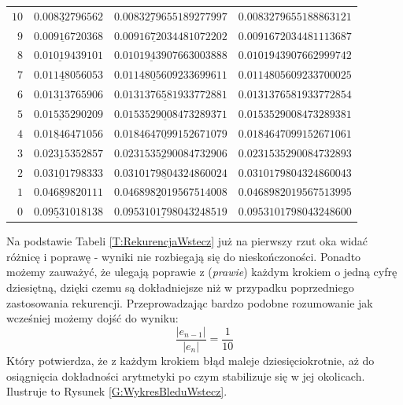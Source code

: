 \documentclass[11pt,leqno]{article}
\begin{document}
\begin{table}[!h]
\begin{center}
\begin{tabular}{r|l|l|l}
        $10$          & $\underline{0.008327965}62$ & $\underline{0.008327965518}9277997$ & $0.0083279655188863121$ \\
        $9$           & $\underline{0.009167203}68$ & $\underline{0.0091672034481}072202$ & $0.0091672034481113687$ \\
        $8$           & $\underline{0.01019439}101$ & $\underline{0.010194390766}3003888$ & $0.0101943907662999742$ \\
        $7$           & $\underline{0.011480560}53$ & $\underline{0.0114805609233}699611$ & $0.0114805609233700025$ \\
        $6$           & $\underline{0.01313765}906$ & $\underline{0.01313765819337728}81$ & $0.0131376581933772854$ \\
        $5$           & $\underline{0.01535290}209$ & $\underline{0.01535290084732893}71$ & $0.0153529008473289381$ \\
        $4$           & $\underline{0.0184647}1056$ & $\underline{0.01846470991526710}79$ & $0.0184647099152671061$ \\
        $3$           & $\underline{0.02315352}857$ & $\underline{0.0231535290084732}906$ & $0.0231535290084732893$ \\
        $2$           & $\underline{0.03101798}333$ & $\underline{0.03101798043248600}24$ & $0.0310179804324860043$ \\
        $1$           & $\underline{0.046898201}11$ & $\underline{0.046898201956751}4008$ & $0.0468982019567513995$ \\
        $0$           & $\underline{0.0953101}8138$ & $\underline{0.0953101798043248}519$ & $0.0953101798043248600$ \\
    \end{tabular}
\end{center}
\vspace{-1,5em}
\end{table}
Na podstawie Tabeli \ref{T:RekurencjaWstecz} już na pierwszy rzut oka widać różnicę i poprawę - wyniki nie rozbiegają się do nieskończoności.
Ponadto możemy zauważyć, że ulegają poprawie z (\textit{prawie}) każdym krokiem o jedną cyfrę dziesiętną, dzięki czemu są dokładniejsze niż w przypadku poprzedniego zastosowania rekurencji.
Przeprowadzając bardzo podobne rozumowanie jak wcześniej możemy dojść do wyniku:
$$
    \frac{|e_{n-1}|}{|e_{n}|} = \frac{1}{10}
$$
Który potwierdza, że z każdym krokiem błąd maleje dziesięciokrotnie, aż do osiągnięcia dokładności arytmetyki po czym stabilizuje się w jej okolicach.
Ilustruje to Rysunek \ref{G:WykresBleduWstecz}.
\end{document}
